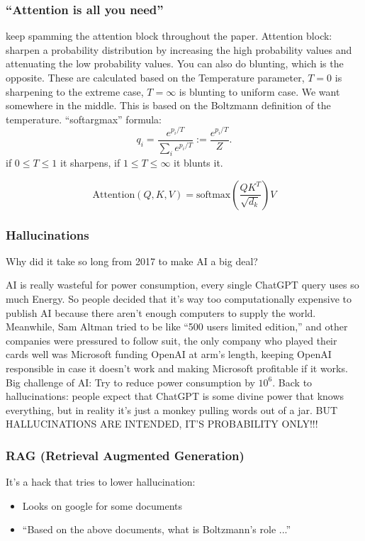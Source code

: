 \documentclass[12pt]{article}
\begin{document}
\subsubsection{``Attention is all you need''} keep spamming the attention block throughout the paper. Attention block: sharpen a probability distribution by increasing the high probability values and attenuating the low probability values. You can also do blunting, which is the opposite. These are calculated based on the Temperature parameter, $T=0$ is sharpening to the extreme case, $T=\infty$ is blunting to uniform case. We want somewhere in the middle. This is based on the Boltzmann definition of the temperature. ``softargmax'' formula:
\[q_i=\frac{e^{p_i/T}}{\sum_ie^{p_i/T}}:=\frac{e^{p_i/T}}{Z}.\]
if $0\le T\le 1$ it sharpens, if $1\le T\le\infty$ it blunts it.

\[
\mathrm{Attention}(Q,K,V) = \mathrm{softmax}\left(\frac{Q K^T}{\sqrt{d_k}}\right) V
\]


\subsubsection{Hallucinations}
Why did it take so long from 2017 to make AI a big deal? 

AI is really wasteful for power consumption, every single ChatGPT query uses so much Energy. So people decided that it's way too computationally expensive to publish AI because there aren't enough computers to supply the world. Meanwhile, Sam Altman tried to be like ``500 users limited edition,'' and other companies were pressured to follow suit, the only company who played their cards well was Microsoft funding OpenAI at arm's length, keeping OpenAI responsible in case it doesn't work and making Microsoft profitable if it works. Big challenge of AI: Try to reduce power consumption by $10^6.$ Back to hallucinations: people expect that ChatGPT is some divine power that knows everything, but in reality it's just a monkey pulling words out of a jar. BUT HALLUCINATIONS ARE INTENDED, IT'S PROBABILITY ONLY!!!




\subsubsection{RAG (Retrieval Augmented Generation)}
It's a hack that tries to lower hallucination:
\begin{itemize}
    \item Looks on google for some documents
    \item ``Based on the above documents, what is Boltzmann's role ...''
\end{itemize}
\end{document}
